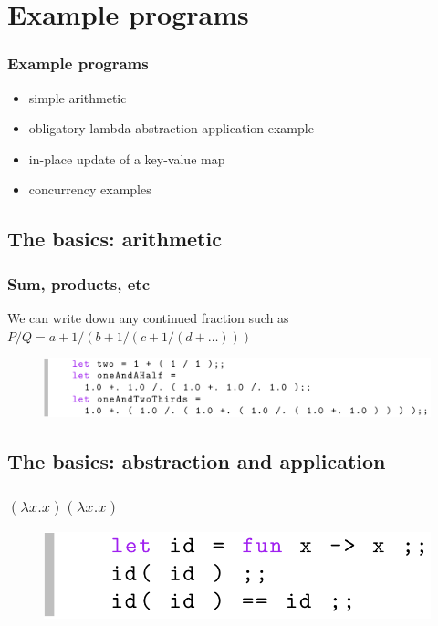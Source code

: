 \documentclass{beamer}
\begin{document}
  \section{Example programs}
  \begin{frame}
    \frametitle{Example programs}
    \begin{itemize}
      \item simple arithmetic
      \item obligatory lambda abstraction application example
      \item in-place update of a key-value map
      \item concurrency examples        
    \end{itemize}
  \end{frame}
  \subsection{The basics: arithmetic}
  \begin{frame}
    \frametitle{Sum, products, etc}    
    We can write down any continued fraction such as
    $P/Q = a + 1/(b + 1/(c + 1/(d + \ldots)))$        
    \begin{figure}[ht]
      \begin{center}        
        \includegraphics[width=\textwidth,height=0.8\textheight,keepaspectratio]{pipelinefigures/CodeSamplesArithmetic.pdf}
      \end{center}      
    \end{figure}
  \end{frame}
  \subsection{The basics: abstraction and application}
  \begin{frame}
    \frametitle{$(\lambda x.x)(\lambda x.x)$}    
    \begin{figure}[ht]
      \begin{center}        
        \includegraphics[width=\textwidth,height=0.2\textheight,keepaspectratio]{pipelinefigures/CodeSamplesAbstractionApplication.pdf}
      \end{center}      
    \end{figure}
  \end{frame}
\end{document}
